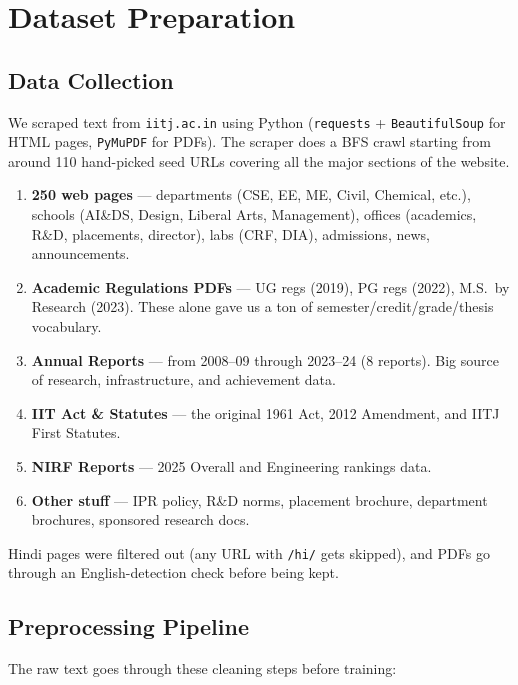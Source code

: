 \documentclass[11pt,a4paper]{article}
\begin{document}
\section{Dataset Preparation}

\subsection{Data Collection}

We scraped text from \texttt{iitj.ac.in} using Python (\texttt{requests} + \texttt{BeautifulSoup} for HTML pages, \texttt{PyMuPDF} for PDFs). The scraper does a BFS crawl starting from around 110 hand-picked seed URLs covering all the major sections of the website.

\begin{enumerate}[leftmargin=2em, label=\arabic*.]
  \item \textbf{250 web pages} --- departments (CSE, EE, ME, Civil, Chemical, etc.), schools (AI\&DS, Design, Liberal Arts, Management), offices (academics, R\&D, placements, director), labs (CRF, DIA), admissions, news, announcements.
  \item \textbf{Academic Regulations PDFs} --- UG regs (2019), PG regs (2022), M.S.\ by Research (2023). These alone gave us a ton of semester/credit/grade/thesis vocabulary.
  \item \textbf{Annual Reports} --- from 2008--09 through 2023--24 (8 reports). Big source of research, infrastructure, and achievement data.
  \item \textbf{IIT Act \& Statutes} --- the original 1961 Act, 2012 Amendment, and IITJ First Statutes.
  \item \textbf{NIRF Reports} --- 2025 Overall and Engineering rankings data.
  \item \textbf{Other stuff} --- IPR policy, R\&D norms, placement brochure, department brochures, sponsored research docs.
\end{enumerate}

Hindi pages were filtered out (any URL with \texttt{/hi/} gets skipped), and PDFs go through an English-detection check before being kept.

\subsection{Preprocessing Pipeline}

The raw text goes through these cleaning steps before training:
\end{document}
